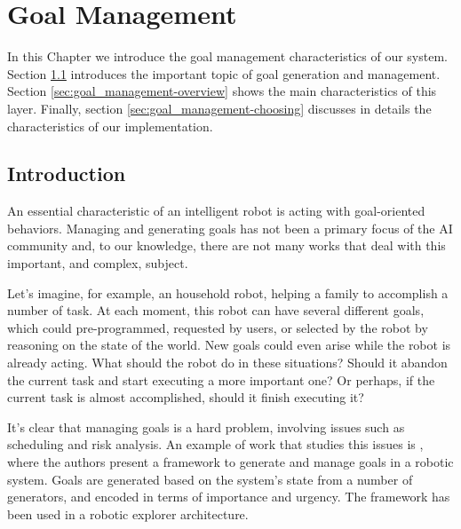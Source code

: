 
\chapter{Goal Management} %

\label{chapter:goal_management} %

In this Chapter we introduce the goal management characteristics of our system. Section \ref{sec:goal_management-intro} introduces the important topic of goal generation and management. Section \ref{sec:goal_management-overview} shows the main characteristics of this layer. Finally, section \ref{sec:goal_management-choosing} discusses in details the characteristics of our implementation.

\section{Introduction}
\label{sec:goal_management-intro}
An essential characteristic of an intelligent robot is acting with goal-oriented behaviors. Managing and generating goals has not been a primary focus of the AI community and, to our knowledge, there are not many works that deal with this important, and complex, subject. 

Let's imagine, for example, an household robot, helping a family to accomplish a number of task. At each moment, this robot can have several different goals, which could pre-programmed, requested by users, or selected by the robot by reasoning on the state of the world. New goals could even arise while the robot is already acting. What should the robot do in these situations? Should it abandon the current task and start executing a more important one? Or perhaps, if the current task is almost accomplished, should it finish executing it?  

It's clear that managing goals is a hard problem, involving issues such as scheduling and risk analysis. An example of work that studies this issues is \cite{hanheide2010framework}, where the authors present a framework to generate and manage goals in a robotic system. Goals are generated based on the system's state from a number of generators, and encoded in terms of importance and urgency. The framework has been used in a robotic explorer architecture.


